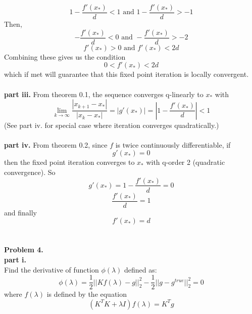 \documentclass{article} %
\begin{document}
\begin{equation}
1 - \frac{f'(x_*)}{d}<1 \textrm{ and } 1 - \frac{f'(x_*)}{d}>-1
\end{equation}
Then,
\begin{equation}
- \frac{f'(x_*)}{d}<0 \textrm{ and } - \frac{f'(x_*)}{d}>-2
\end{equation}
\begin{equation}
f'(x_*)>0 \textrm{ and } f'(x_*)<2d
\end{equation}
Combining these gives us the condition
\begin{equation}
0 < f'(x_*) < 2d
\end{equation}
which if met will guarantee that this fixed point iteration is locally convergent.
\\
\\
\textbf{part iii.}
From theorem 0.1, the sequence converges q-linearly to $x_*$ with 
\begin{equation}
\lim_{k\to\infty} \frac{|x_{k+1}-x_*|}{|x_k-x_*|} = |g'(x_*)|=|1 - \frac{f'(x_*)}{d}|<1
\end{equation}
(See part iv. for special case where iteration converges quadratically.)
\\
\\
\textbf{part iv.}
From theorem 0.2, since $f$ is twice continuously differentiable, if 
\begin{equation}
g'(x_*)=0
\end{equation}
then the fixed point iteration converges to $x_*$ with q-order 2 (quadratic convergence).  So
\begin{equation}
g'(x_*)=1 - \frac{f'(x_*)}{d}=0
\end{equation}
\begin{equation}
\frac{f'(x_*)}{d}=1
\end{equation}
and finally
\begin{equation}
f'(x_*)=d
\end{equation}
\\
\\
\textbf{Problem 4.} \\
\textbf{part i.} \\
Find the derivative of function $\phi(\lambda)$ defined as:
\begin{equation}
\phi(\lambda) = \frac{1}{2}||Kf(\lambda)-g||_2^2-\frac{1}{2}||g-g^{true}||_2^2=0
\end{equation}
where $f(\lambda)$ is defined by the equation
\begin{equation}
(K^TK+\lambda I)f(\lambda)=K^Tg
\end{equation}
\end{document}
